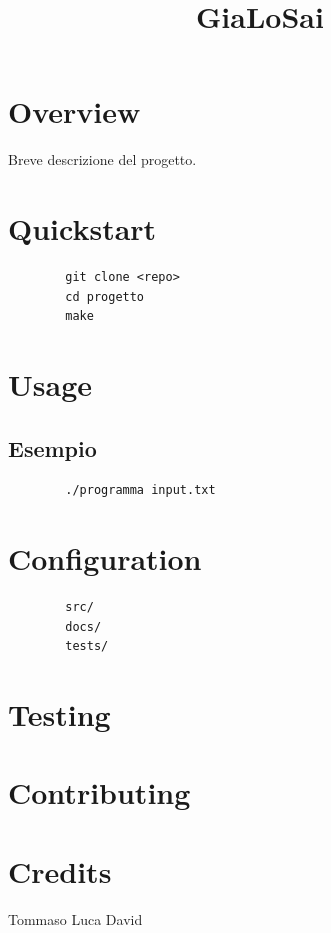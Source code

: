 \documentclass[a4paper,11pt]{article}
\title{GiaLoSai}
\date{}
\begin{document}
\maketitle

\tableofcontents
\newpage

\section{Overview}
Breve descrizione del progetto.

\section{Quickstart}
\begin{verbatim}
		git clone <repo>
		cd progetto
		make
	\end{verbatim}

\section{Usage}

\subsection{Esempio}

\begin{verbatim}
		./programma input.txt
	\end{verbatim}

\section{Configuration}

\begin{verbatim}
		src/
		docs/
		tests/
	\end{verbatim}

\section{Testing}

\section{Contributing}

\section{Credits}

Tommaso Luca David
\end{document}
